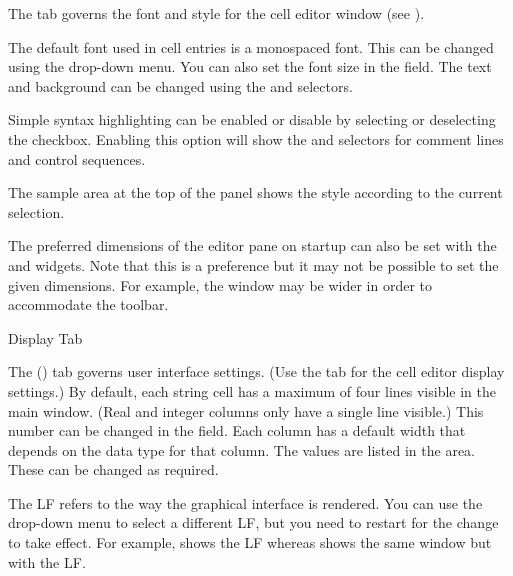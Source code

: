 
The  tab governs the font and style for
the cell editor window (see ).

The default font used in cell entries is a monospaced font. This can be
changed using the  drop-down menu.
You can also set the font size in the 
 field.
The text  and background  can be changed 
using the 
and  selectors.

Simple syntax highlighting can be enabled or disable by selecting
or deselecting the  checkbox.
Enabling this option will show the 
 and
 selectors for comment
lines and control sequences.

The sample area at the top of the panel shows the style according to
the current selection.

The preferred dimensions of the editor pane on startup can also be
set with the  and
 widgets. Note that this is a
preference but it may not be possible to set the given dimensions.
For example, the window may be wider in order to accommodate the
toolbar.


 {%
 }
 {Display Tab}

The  () tab governs user interface settings.
(Use the  tab for the cell editor display
settings.)
By default, each
string cell has a maximum of four lines visible in the main window.
(Real and integer columns only have a single line visible.) This
number can be changed in the 
field. Each column has a default width that depends on the data type
for that column. The values are listed in the 
 area. These can be changed
as required.

The \gls{LF} refers to the way the graphical interface
is rendered. You can use the drop-down menu to
select a different \gls{LF}, but you need to restart  
for the change to take effect. For example, 
shows the  \gls{LF} whereas
shows the same window but with the  \gls{LF}.

